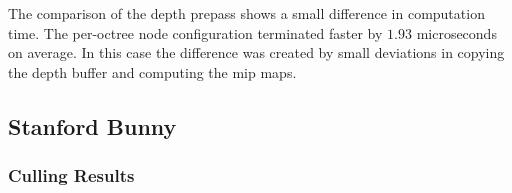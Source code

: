 \noindent
The comparison of the depth prepass shows a small difference in computation time. The per-octree node configuration 
terminated faster by $1.93$ microseconds on average. In this case the difference was created by small deviations in 
copying the depth buffer and computing the mip maps. 


\clearpage




\subsection*{Stanford Bunny}

\subsubsection*{Culling Results} \label{subsubsec-culling-results-bunny}


